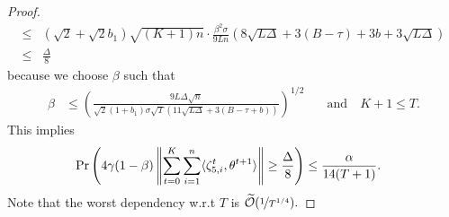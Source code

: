 \documentclass[a4paper,11pt]{article}
\begin{document}
\begin{proof}
\begin{align*}
    \le& (\sqrt{2}+\sqrt{2}b_1)\sqrt{(K+1)n} \cdot \frac{\beta^2\sigma}{9Ln}\left(8\sqrt{L\Delta} +3(B-\tau)+3b + 3\sqrt{L\Delta}\right)\\
    \le&\frac{\Delta}{8}
    \end{align*}
    because we choose $\beta$ such that
    \begin{align}\label{eq:stepsize_bound_8}
    \beta &\le \left(\frac{9L\Delta\sqrt{n}}{\sqrt{2}(1+b_1)\sigma\sqrt{T}\left(11\sqrt{L\Delta} +3(B-\tau+b) \right)}\right)^{1/2}
    &\quad \text{and} \quad K+1\le T.
    \end{align}
    This implies 
    \begin{align*}
    &\Pr\left(4\gamma(1-\beta)\left\|\sum_{t=0}^K\sum_{i=1}^n\<\zeta_{5,i}^t,\theta^{t+1}>\right\| \ge \frac{\Delta}{8}\right) \le \frac{\alpha}{14(T+1)}.
    \end{align*}
    Note that the worst dependency w.r.t $T$ is $\widetilde{\mathcal O}(\nicefrac{1}{T^{1/4}}).$


\end{proof}
\end{document}
